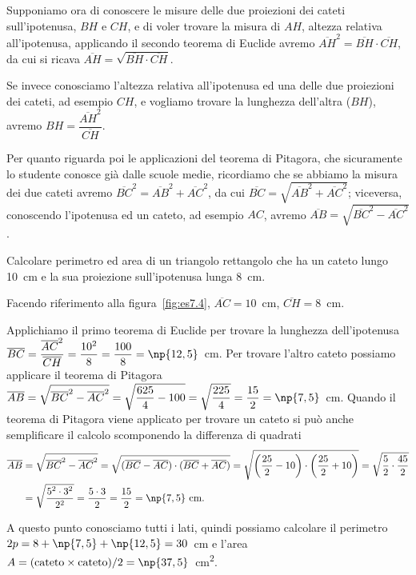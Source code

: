 Supponiamo ora di conoscere le misure delle due proiezioni dei cateti 
sull'ipotenusa, $BH$ e $CH$, e di voler trovare la misura di $AH$, 
altezza relativa all'ipotenusa, applicando il secondo teorema di 
Euclide avremo $\overline{AH}^2=\overline{BH}\cdot \overline{CH}$, da 
cui si ricava $\overline{AH}=\sqrt{\overline{BH}\cdot\overline{CH}}$.

Se invece conosciamo l'altezza relativa all'ipotenusa ed una delle 
due proiezioni dei cateti, ad esempio $CH$, e vogliamo trovare la 
lunghezza dell'altra ($BH$), avremo 
$BH=\dfrac{\overline{AH}^2}{\overline{CH}}$.

Per quanto riguarda poi le applicazioni del teorema di Pitagora, che 
sicuramente lo studente conosce già dalle scuole medie, ricordiamo 
che se abbiamo la misura dei due cateti avremo 
$\overline{BC}^2=\overline{AB}^2+\overline{AC}^2$, da cui 
$\overline{BC}=\sqrt{\overline{AB}^2+\overline{AC}^2}$; viceversa, 
conoscendo l'ipotenusa ed un cateto, ad esempio $AC$, avremo 
$\overline{AB}=\sqrt{\overline{BC}^2-\overline{AC}^2}$.

\begin{esempio}\label{es:7.4}
Calcolare perimetro ed area di un triangolo rettangolo che ha un 
cateto lungo 10~cm e la sua proiezione sull'ipotenusa lunga 
8~cm.\vspace{7pt}

Facendo riferimento alla figura~\ref{fig:es7.4}, 
$\overline{AC}=10$~cm, $\overline{CH}=8$~cm.

Applichiamo il primo teorema di Euclide per trovare la lunghezza 
dell'ipotenusa 
$\overline{BC}=\dfrac{\overline{AC}^2}{\overline{CH}}=\dfrac{10^2}{8}
=\dfrac{100}{8}=\np{12,5}$~cm. Per trovare l'altro cateto possiamo 
applicare il teorema di Pitagora 
$\overline{AB}=\sqrt{\overline{BC}^2-\overline{AC}^2}=\sqrt{\dfrac{625
}{4}-100}=\sqrt{\dfrac{225}{4}}=\dfrac{15}{2}=\np{7,5}$~cm.
Quando il teorema di Pitagora viene applicato per trovare un cateto 
si può anche semplificare il calcolo scomponendo la differenza di 
quadrati
\begin{align*}
\overline{AB}&=\sqrt{\overline{BC}^2-\overline{AC}^2}=\sqrt{(\overline
{BC}-\overline{AC})\cdot(\overline{BC}+\overline{AC})}=\sqrt{
\left(\dfrac{25}{2}-10\right)\cdot\left(\dfrac{25}{2}+10\right)}=\sqrt
{\dfrac{5}{2}\cdot\dfrac{45}{2}}\\
&=\sqrt{\dfrac{5^2\cdot 3^2}{2^2}}=\dfrac{5\cdot 
3}{2}=\dfrac{15}{2}=\np{7,5}\text{~cm.}
\end{align*}

A questo punto conosciamo tutti i lati, quindi possiamo calcolare il 
perimetro $2p=8+\np{7,5}+\np{12,5}=30$~cm e l'area 
$A=(\text{cateto}\times\text{cateto})/2 = 
\np{37,5}$~cm\textsuperscript{2}.
\end{esempio}

